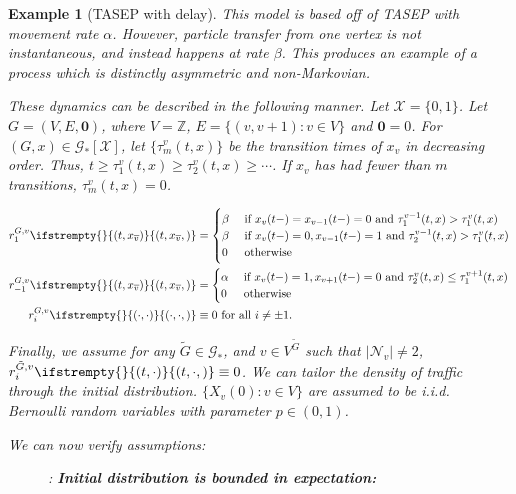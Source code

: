 \documentclass[12pt]{article}
\newcommand{\mb}{\mathbb}
\newcommand{\mc}{\mathcal}
\newcommand{\ov}{\overline}
\newcommand{\te}{\text}
\newcommand{\ind}{\hspace{24pt}}
\newcommand{\sta}{\mc{X}}							%
\newcommand{\neigh}[1]{\mc{N}_{#1}}				%
\newcommand{\cl}[1]{\ov{#1}}						%
\renewcommand{\root}{\mathbf{0}}					%
\newcommand{\Xf}{X}									%
\newcommand{\rate}{r}								%
\newcommand{\xf}{x}									%
\newcommand{\vind}[1]{_{#1}}						%
\newcommand{\tme}[1]{(#1)}							%
\newcommand{\gind}[1]{^{#1}}						%
\newcommand{\stpara}[1]{_{#1}}						%
\newcommand{\gvpara}[2]{^{#1,#2}}					%
\newcommand{\Gs}{\mc{G}_\ast}						%
\newcommand{\tmepro}[3]{
\ifstrempty{#3}{
	\left(#1,#2\right)}{
	\left(#1,#2,#3\right)}}							%
\renewcommand{\sp}[1]{[#1]}							%
\newtheorem{example}[thms]{Example}
\begin{document}
\begin{example}[TASEP with delay]

This model is based off of TASEP with movement rate \(\alpha\). However, particle transfer from one vertex is not instantaneous, and instead happens at rate \(\beta\). This produces an example of a process which is distinctly asymmetric and non-Markovian.

\ind These dynamics can be described in the following manner. Let \(\sta = \{0,1\}\). Let \(G = (V,E,\root)\), where \(V = \mb{Z}\), \(E = \{(v,v+1): v \in V\}\) and \(\root = 0\). For \((G,\xf)\in \Gs\sp{\sta}\), let \(\{\tau^v_m(t,\xf)\}\) be the transition times of \(\xf\vind{v}\) in decreasing order. Thus, \(t \geq \tau^v_1(t,\xf) \geq \tau^v_2(t,\xf) \geq\cdots\). If \(\xf\vind{v}\) has had fewer than \(m\) transitions, \(\tau^v_m(t,\xf) = 0\).

\begin{align*}
\rate\gvpara{G}{v}\stpara{1}\tmepro{t}{\xf_{\cl{v}}}{} &=  \begin{cases}
\beta &\te{ if } \xf\vind{v}\tme{t-} = \xf\vind{v-1}\tme{t-} = 0\te{ and } \tau^{v-1}_1(t,\xf) > \tau^v_1(t,\xf)\\
\beta &\te{ if } \xf\vind{v}\tme{t-} = 0,\xf\vind{v-1}\tme{t-} = 1\te{ and } \tau^{v-1}_2(t,\xf) > \tau^v_1(t,\xf)\\
0&\te{ otherwise}
\end{cases}\\
\rate\gvpara{G}{v}\stpara{-1}\tmepro{t}{\xf_{\cl{v}}}{} &=  \begin{cases}
\alpha &\te{ if } \xf\vind{v}\tme{t-} = 1, \xf\vind{v+1}\tme{t-} = 0\te{ and } \tau^{v}_2(t,\xf) \leq \tau^{v+1}_1(t,\xf)\\
0&\te{ otherwise}
\end{cases}\\
\rate\gvpara{G}{v}\stpara{i}\tmepro{\cdot}{\cdot}{} &\equiv 0\te{ for all } i \neq \pm 1.
\end{align*}

Finally, we assume for any \(\tilde{G} \in \Gs\), and \(v \in V\gind{\tilde{G}}\) such that \(|\neigh{v}| \neq 2\), \(\rate\gvpara{\tilde{G}}{v}\stpara{i}\tmepro{t}{\cdot}{} \equiv 0\). We can tailor the density of traffic through the initial distribution. \(\{\Xf\vind{v}\tme{0}:v \in V\}\) are assumed to be i.i.d. Bernoulli random variables with parameter \(p \in (0,1)\).

\ind We can now verify assumptions:

\begin{description}
\item[] \cite[Assumption \ref{F-a::bddinit}]{F}: \textbf{Initial distribution is bounded in expectation:}


\end{description}
\end{example}
\end{document}
